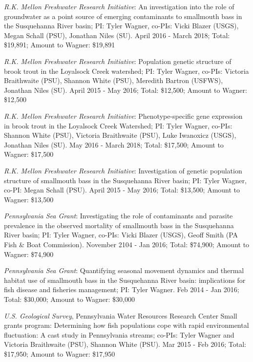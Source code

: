 \documentclass[10pt]{article}
\begin{document}
\begin{flushleft}
\begin{etaremune}
\item {\sl  R.K. Mellon Freshwater Research Initiative}: An investigation into the role of groundwater as a point source of emerging contaminants to smallmouth bass in the Susquehanna River basin; PI: Tyler Wagner, co-PIs: Vicki Blazer (USGS), Megan Schall (PSU), Jonathan Niles (SU). April 2016 - March 2018; Total: \$19,891; Amount to Wagner: \$19,891

\item {\sl  R.K. Mellon Freshwater Research Initiative}: Population genetic structure of brook trout in the Loyalsock Creek watershed; PI: Tyler Wagner, co-PIs: Victoria Braithwaite (PSU), Shannon White (PSU), Meredith Bartron (USFWS), Jonathan Niles (SU). April 2015 - May 2016; Total: \$12,500; Amount to Wagner: \$12,500

\item {\sl  R.K. Mellon Freshwater Research Initiative}: Phenotype-specific gene expression in brook trout in the Loyalsock Creek Watershed; PI: Tyler Wagner, co-PIs: Shannon White (PSU), Victoria Braithwaite (PSU), Luke Iwanoxicz (USGS), Jonathan Niles (SU). May 2016 - March 2018; Total: \$17,500; Amount to Wagner: \$17,500

\item {\sl  R.K. Mellon Freshwater Research Initiative}: Investigation of genetic population structure of smallmouth bass in the Susquehanna River basin; PI: Tyler Wagner, co-PI: Megan Schall (PSU). April 2015 - May 2016; Total: \$13,500; Amount to Wagner: \$13,500

\item {\sl Pennsylvania Sea Grant}: Investigating the role of contaminants and parasite prevalence in the observed mortality of smallmouth bass in the Susquehanna River basin; PI: Tyler Wagner, co-PIs: Vicki Blazer (USGS), Geoff Smith (PA Fish \& Boat Commission). November 2104 - Jan 2016; Total: \$74,900; Amount to Wagner: \$74,900

\item {\sl Pennsylvania Sea Grant}: Quantifying seasonal movement dynamics and thermal habitat use of smallmouth bass in the Susquehanna River basin: implications for fish disease and fisheries management; PI: Tyler Wagner. Feb 2014 - Jan 2016; Total: \$30,000; Amount to Wagner: \$30,000

\item {\sl U.S. Geological Survey}, Pennsylvania Water Resources Research Center Small grants program: Determining how fish populations cope with rapid environmental fluctuation: A cast study in Pennsylvania streams; co-PIs: Tyler Wagner and Victoria Braithwaite (PSU), Shannon White (PSU). Mar 2015 - Feb 2016; Total: \$17,950; Amount to Wagner: \$17,950


\end{etaremune}
\end{flushleft}
\end{document}
